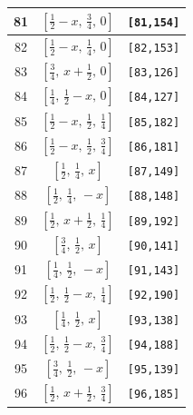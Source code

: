 \documentclass[fleqn,8pt]{jsarticle}
\begin{document}
\begin{longtable}{ccc}
81 & $\left[ \frac{1}{2} - x,\, \frac{3}{4},\, 0 \right]$ & {\tt [81,154]} \\ \hline
82 & $\left[ \frac{1}{2} - x,\, \frac{1}{4},\, 0 \right]$ & {\tt [82,153]} \\ \hline
83 & $\left[ \frac{3}{4},\, x + \frac{1}{2},\, 0 \right]$ & {\tt [83,126]} \\ \hline
84 & $\left[ \frac{1}{4},\, \frac{1}{2} - x,\, 0 \right]$ & {\tt [84,127]} \\ \hline
85 & $\left[ \frac{1}{2} - x,\, \frac{1}{2},\, \frac{1}{4} \right]$ & {\tt [85,182]} \\ \hline
86 & $\left[ \frac{1}{2} - x,\, \frac{1}{2},\, \frac{3}{4} \right]$ & {\tt [86,181]} \\ \hline
87 & $\left[ \frac{1}{2},\, \frac{1}{4},\, x \right]$ & {\tt [87,149]} \\ \hline
88 & $\left[ \frac{1}{2},\, \frac{1}{4},\, - x \right]$ & {\tt [88,148]} \\ \hline
89 & $\left[ \frac{1}{2},\, x + \frac{1}{2},\, \frac{1}{4} \right]$ & {\tt [89,192]} \\ \hline
90 & $\left[ \frac{3}{4},\, \frac{1}{2},\, x \right]$ & {\tt [90,141]} \\ \hline
91 & $\left[ \frac{1}{4},\, \frac{1}{2},\, - x \right]$ & {\tt [91,143]} \\ \hline
92 & $\left[ \frac{1}{2},\, \frac{1}{2} - x,\, \frac{1}{4} \right]$ & {\tt [92,190]} \\ \hline
93 & $\left[ \frac{1}{4},\, \frac{1}{2},\, x \right]$ & {\tt [93,138]} \\ \hline
94 & $\left[ \frac{1}{2},\, \frac{1}{2} - x,\, \frac{3}{4} \right]$ & {\tt [94,188]} \\ \hline
95 & $\left[ \frac{3}{4},\, \frac{1}{2},\, - x \right]$ & {\tt [95,139]} \\ \hline
96 & $\left[ \frac{1}{2},\, x + \frac{1}{2},\, \frac{3}{4} \right]$ & {\tt [96,185]} \\
\end{longtable}
\renewcommand{\arraystretch}{1.2}
\end{document}
